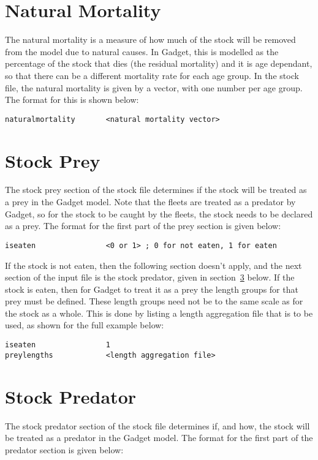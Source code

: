 \documentclass [a4paper, 10pt]{book}
\begin{document}
\section{Natural Mortality}\label{subsec:stocknatmort}
The natural mortality is a measure of how much of the stock will be removed from the model due to natural causes.  In Gadget, this is modelled as the percentage of the stock that dies (the residual mortality) and it is age dependant, so that there can be a different mortality rate for each age group.  In the stock file, the natural mortality is given by a vector, with one number per age group.  The format for this is shown below:

{\small\begin{verbatim}
naturalmortality       <natural mortality vector>
\end{verbatim}}

\section{Stock Prey}\label{subsec:stockprey}
The stock prey section of the stock file determines if the stock will be treated as a prey in the Gadget model.  Note that the fleets are treated as a predator by Gadget, so for the stock to be caught by the fleets, the stock needs to be declared as a prey.  The format for the first part of the prey section is given below:

{\small\begin{verbatim}
iseaten                <0 or 1> ; 0 for not eaten, 1 for eaten
\end{verbatim}}

If the stock is not eaten, then the following section doesn't apply, and the next section of the input file is the stock predator, given in section~\ref{subsec:stockpredator} below.  If the stock is eaten, then for Gadget to treat it as a prey the length groups for that prey must be defined.  These length groups need not be to the same scale as for the stock as a whole.  This is done by listing a length aggregation file that is to be used, as shown for the full example below:

{\small\begin{verbatim}
iseaten                1
preylengths            <length aggregation file>
\end{verbatim}}

\section{Stock Predator}\label{subsec:stockpredator}
The stock predator section of the stock file determines if, and how, the stock will be treated as a predator in the Gadget model.  The format for the first part of the predator section is given below:
\end{document}
